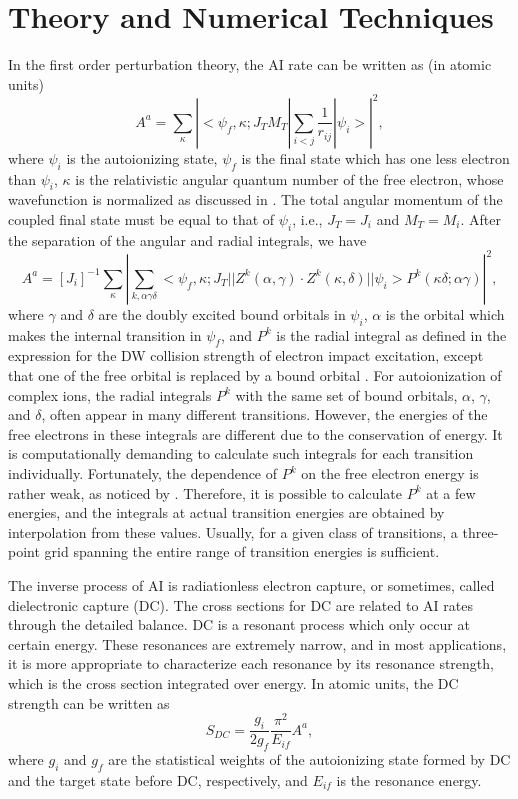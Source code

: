 \documentclass{elsart}
\begin{document}
\section{Theory and Numerical Techniques}
\label{sec_theory}
In the first order perturbation theory, the AI rate can be written as (in
atomic units) 
\begin{equation}
A^a = \sum_\kappa \left|
<\psi_f,\kappa;J_TM_T|\sum_{i<j}\frac{1}{r_{ij}}|\psi_i>\right|^2,
\end{equation}
where $\psi_i$ is the autoionizing state, $\psi_f$ is the final state which has
one less electron than $\psi_i$, $\kappa$ is the relativistic angular quantum
number of the free electron, whose wavefunction is normalized as discussed in
. The total angular momentum of the coupled final state must
be equal to that of $\psi_i$, i.e.,  $J_T = J_i$ and $M_T = M_i$. After the
separation of the angular and radial integrals, we have
\begin{equation}
A^a = [J_i]^{-1}\sum_\kappa \left|\sum_{k,\alpha\gamma\delta}
<\psi_f,\kappa;J_T||Z^k(\alpha,\gamma)
\cdot Z^k(\kappa,\delta)||\psi_i>P^k(\kappa\delta;\alpha\gamma)\right|^2,
\end{equation}
where $\gamma$ and $\delta$ are the doubly excited bound orbitals in
$\psi_i$, $\alpha$ is the orbital which makes the internal transition in
$\psi_f$, and
$P^k$ is the radial integral as defined in the expression for the DW collision
strength of electron impact excitation, except that one of the free orbital
is replaced by a bound orbital . For autoionization of
complex ions, the radial integrals $P^k$ with the same set of bound orbitals,
$\alpha$, $\gamma$, and $\delta$, 
often appear in many different transitions. However, the energies of the free
electrons in these integrals are different due to the conservation of
energy. It is 
computationally demanding to calculate such integrals for each transition
individually. Fortunately, the dependence of $P^k$ on the free electron energy
is rather weak, as noticed by \citet{oreg91}. Therefore, it is possible to
calculate $P^k$ at a few energies, and the integrals at actual transition
energies are obtained by interpolation from these values. Usually, for a given
class of 
transitions, a three-point grid spanning the entire range of transition
energies is sufficient.

The inverse process of AI is radiationless electron capture, or sometimes,
called dielectronic capture (DC). The cross sections for DC are related to AI
rates through the detailed balance. DC is a resonant process which only occur
at certain energy. These resonances are extremely narrow, and in most
applications, it is more appropriate to characterize each resonance by its
resonance strength, which is the cross section integrated over energy. In
atomic units, the DC strength can be written as
\begin{equation}
S_{DC} = \frac{g_i}{2g_f}\frac{\pi^2}{E_{if}}A^a,
\end{equation}
where $g_i$ and $g_f$ are the statistical weights of the autoionizing state
formed by DC and the target state before DC, respectively, and $E_{if}$ is the
resonance energy. 
\end{document}

